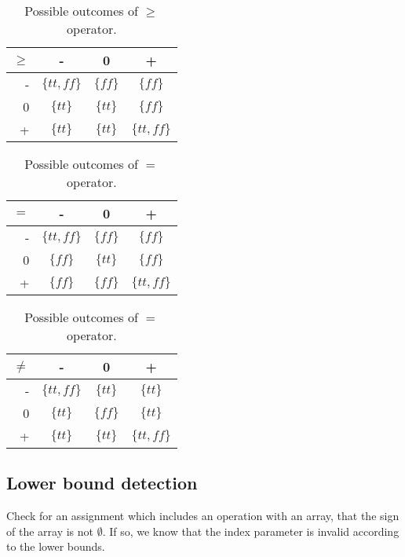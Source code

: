 \begin{table}
\begin{tabular}{| r | c | c | c |}
\hline
 $\geq$   & -   & 0 & +  \\
\hline
 -  & $\{tt,ff\}$ & $\{ff\}$ & $\{ff\}$  \\
\hline
 0  & $\{tt\}$ & $\{tt\}$ & $\{ff\}$ \\
\hline
 +  & $\{tt\}$ & $\{tt\}$ & $\{tt,ff\}$ \\
 \hline
\end{tabular}
\centering
\caption{Possible outcomes of $\geq$ operator.}
\label{table:greater_than_equal_operator}
\end{table}

\begin{table}
\begin{tabular}{| r | c | c | c |}
\hline
 $=$   & -   & 0 & +  \\
\hline
 -  & $\{tt,ff\}$ & $\{ff\}$ & $\{ff\}$  \\
\hline
 0  & $\{ff\}$ & $\{tt\}$ & $\{ff\}$ \\
\hline
 +  & $\{ff\}$ & $\{ff\}$ & $\{tt,ff\}$ \\
 \hline
\end{tabular}
\centering
\caption{Possible outcomes of $=$ operator.}
\label{table:equal_operator}
\end{table}

\begin{table}
\begin{tabular}{| r | c | c | c |}
\hline
 $\neq$   & -   & 0 & +  \\
\hline
 -  & $\{tt,ff\}$ & $\{tt\}$ & $\{tt\}$  \\
\hline
 0  & $\{tt\}$ & $\{ff\}$ & $\{tt\}$ \\
\hline
 +  & $\{tt\}$ & $\{tt\}$ & $\{tt,ff\}$ \\
 \hline
\end{tabular}
\centering
\caption{Possible outcomes of $=$ operator.}
\label{table:not_equal_operator}
\end{table}


\subsection{Lower bound detection}
Check for an assignment which includes an operation with an array, that the sign of the array is not $\emptyset$. If so, we know that the index parameter is invalid according to the lower bounds.


